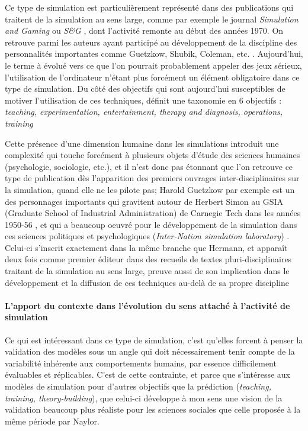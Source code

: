 Ce type de simulation est particulièrement représenté dans des publications qui traitent de la simulation au sens large, comme par exemple le journal \textit{Simulation and Gaming} ou \textit{S\&G} \autocite{Crookall2011}, dont l'activité remonte au début des années 1970. On retrouve parmi les auteurs ayant participé au développement de la discipline des personnalités importantes comme Guetzkow, Shubik, Coleman, etc. \autocite{Crookall2012}. Aujourd'hui, le terme à évolué vers ce que l'on pourrait probablement appeler des jeux sérieux, l'utilisation de l'ordinateur n'étant plus forcément un élément obligatoire dans ce type de simulation. Du côté des objectifs qui sont aujourd'hui susceptibles de motiver l'utilisation de ces techniques, \textcite{Shubik2009} définit une taxonomie en 6 objectifs : \textit{teaching, experimentation, entertainment, therapy and diagnosis, operations, training }

Cette présence d'une dimension humaine dans les simulations introduit une complexité qui touche forcément à plusieurs objets d'étude des sciences humaines (psychologie, sociologie, etc.), et il n'est donc pas étonnant que l'on retrouve ce type de publication dès l'apparition des premiers ouvrages inter-disciplinaires sur la simulation, quand elle ne les pilote pas; Harold Guetzkow par exemple est un des personnages importants qui gravitent autour de Herbert Simon au GSIA (Graduate School of Industrial Administration) de Carnegie Tech dans les années 1950-56 \autocite{Guetzkow2004}, et qui a beaucoup oeuvré pour le développement de la simulation dans ces sciences politiques et psychologiques (\textit{Inter-Nation simulation laboratory}) \autocite{Janda2011, Druckman2010}. Celui-ci s'inscrit exactement dans la même branche que Hermann, et apparaît deux fois comme premier éditeur dans des recueils de textes pluri-disciplinaires traitant de la simulation au sens large, preuve aussi de son implication dans le développement et la diffusion de ces techniques au-delà de sa propre discipline \autocite{Guetzkow1962, Guetzkow1972}

\paragraph{L'apport du contexte dans l'évolution du sens attaché à l'activité de simulation}

Ce qui est intéressant dans ce type de simulation, c'est qu'elles forcent à penser la validation des modèles sous un angle qui doit nécessairement tenir compte de la variabilité inhérente aux comportements humains, par essence difficilement évaluables et réplicables. C'est de cette contrainte, et parce que \textcite{Hermann1967} s'intéresse aux modèles de simulation pour d'autres objectifs que la prédiction (\textit{teaching, training, theory-building}), que celui-ci développe à mon sens une vision de la validation beaucoup plus réaliste pour les sciences sociales que celle proposée à la même période par Naylor.

